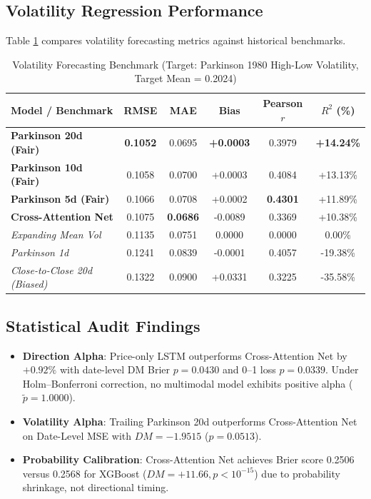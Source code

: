 \documentclass[10pt,journal,compsoc,twocolumn]{IEEEtran}
\begin{document}
\subsection{Volatility Regression Performance}
Table \ref{tab:volatility} compares volatility forecasting metrics against historical benchmarks.

\begin{table}[t]
\caption{Volatility Forecasting Benchmark (Target: Parkinson 1980 High-Low Volatility, Target Mean = 0.2024)}
\label{tab:volatility}
\centering
\small
\begin{tabular}{lccccc}
\toprule
\textbf{Model / Benchmark} & \textbf{RMSE} & \textbf{MAE} & \textbf{Bias} & \textbf{Pearson $r$} & \textbf{$R^2$ (\%)} \\
\midrule
\textbf{Parkinson 20d (Fair)} & \textbf{0.1052} & 0.0695 & \textbf{+0.0003} & 0.3979 & \textbf{+14.24\%} \\
\textbf{Parkinson 10d (Fair)} & 0.1058 & 0.0700 & +0.0003 & 0.4084 & +13.13\% \\
\textbf{Parkinson 5d (Fair)} & 0.1066 & 0.0708 & +0.0002 & \textbf{0.4301} & +11.89\% \\
\textbf{Cross-Attention Net} & 0.1075 & \textbf{0.0686} & -0.0089 & 0.3369 & +10.38\% \\
\textit{Expanding Mean Vol} & 0.1135 & 0.0751 & 0.0000 & 0.0000 & 0.00\% \\
\textit{Parkinson 1d} & 0.1241 & 0.0839 & -0.0001 & 0.4057 & -19.38\% \\
\textit{Close-to-Close 20d (Biased)} & 0.1322 & 0.0900 & +0.0331 & 0.3225 & -35.58\% \\
\bottomrule
\end{tabular}
\end{table}

\subsection{Statistical Audit Findings}
\begin{itemize}
    \item \textbf{Direction Alpha}: Price-only LSTM outperforms Cross-Attention Net by $+0.92\%$ with date-level DM Brier $p = 0.0430$ and 0--1 loss $p = 0.0339$. Under Holm--Bonferroni correction, no multimodal model exhibits positive alpha ($\tilde{p} = 1.0000$).
    \item \textbf{Volatility Alpha}: Trailing Parkinson 20d outperforms Cross-Attention Net on Date-Level MSE with $DM = -1.9515$ ($p = 0.0513$).
    \item \textbf{Probability Calibration}: Cross-Attention Net achieves Brier score 0.2506 versus 0.2568 for XGBoost ($DM = +11.66, p < 10^{-15}$) due to probability shrinkage, not directional timing.
\end{itemize}
\end{document}
